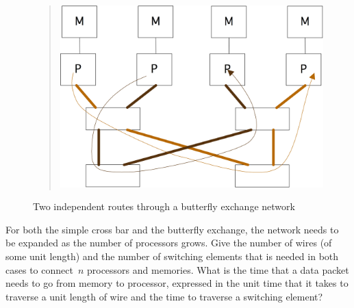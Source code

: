 \begin{figure}[ht]
  \begin{quote}
  \includegraphics[scale=.1]{graphics-public/butterfly3}
  \end{quote}
  \caption{Two independent routes through a butterfly exchange network}
  \label{fig:butterflyroute}
\end{figure}

\begin{exercise}
For both the simple cross bar and the butterfly
exchange, the network needs to be expanded as the number of processors grows. 
Give the number of wires (of some unit length) and the number of switching
elements that is needed in both cases to connect~$n$ processors and memories. 
What is the time that a data packet needs to go from memory to processor,
expressed in the unit time that it takes to traverse a unit length of wire
and the time to traverse a switching element?
\end{exercise}


